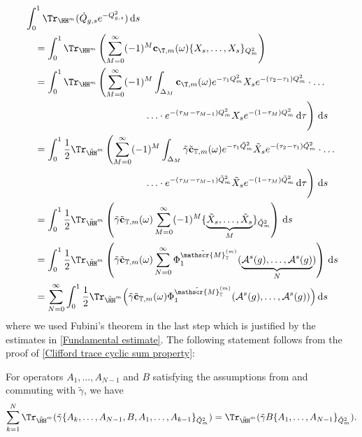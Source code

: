\documentclass[a4paper, english, 12pt, bibliography=totocnumbered,
index=totoc]{scrartcl}
\begin{document}
\begin{align*}
	& \int_0^1 \Tr_{\HH^m}(\dot{Q}_{g,s} e^{-Q_{g,s}^2}) \, \mathrm{d}s \\
	& \quad = \int_0^1 \Tr_{\HH^m} \left(\sum_{M = 0}^\infty (-1)^M
	\mathbf{c}_{\T, m}(\omega) \{X_s, \ldots, X_s\}_{Q_m^2}\right) \\
	& \quad =
	\int_0^1 \Tr_{\HH^m}\left(\sum_{M = 0}^{\infty}(-1)^M \int_{\Delta_M}
	\mathbf{c}_{\T, m}(\omega)e^{-\tau_1Q_m^2}X_s e^{-(\tau_2
		- \tau_1)Q_m^2} \cdot \ldots \right.\\
	& \qquad \qquad \qquad \qquad \qquad \qquad \left.
	\vphantom{\sum_{M=0}^{\infty}} \ldots
	\cdot
	e^{-(\tau_M -
		\tau_{M-1})Q_m^2}X_s e^{-(1-\tau_M)Q_m^2}\, \mathrm{d} \tau \right)\,
	\mathrm{d}s \\
	& \quad = \int_0^1 \frac 12 \Tr_{\tilde{\HH}^m}\left(\sum_{M =
		0}^{\infty}(-1)^M \int_{\Delta_M}
	\tilde{\gamma} \tilde{\mathbf{c}}_{\mathbb{T},
		m}(\omega)e^{-\tau_1\tilde{Q}_m^2}\tilde{X}_s e^{-(\tau_2
		- \tau_1)\tilde{Q}_m^2} \cdot \ldots \right.\\
	& \qquad \qquad \qquad \qquad \qquad \qquad \left.
	\vphantom{\sum_{M=0}^{\infty}}\ldots \cdot
	e^{-(\tau_M -
		\tau_{M-1})\tilde{Q}_m^2}\tilde{X}_s
	e^{-(1-\tau_M)\tilde{Q}_m^2}\, \mathrm{d} \tau \right)\,
	\mathrm{d}s \\
	& \quad = \int_0^1
	\frac 12 \Tr_{\tilde{\HH}^m}\left(\tilde{\gamma}
	\tilde{\mathbf{c}}_{\mathbb{T},
		m}(\omega) \sum_{M = 0}^{\infty}(-1)^M \{\underbrace{\tilde{X}_s,
		\ldots,
		\tilde{X}_s}_M\}_{\tilde{Q}^2_m} \right)\, \mathrm{d}s \\
	& \quad = \int_0^1
	\frac 12 \Tr_{\tilde{\HH}^m}\left(\tilde{\gamma}
	\tilde{\mathbf{c}}_{\mathbb{T},
		m}(\omega) \sum_{N=0}^{\infty}
	\Phi_1^{\tilde{\mathscr{M}}_{\mathbb{T}}^{(m)}}(\underbrace{\mathcal{A}^s(g),
		\ldots, \mathcal{A}^s(g)}_N) \right)\, \mathrm{d}s \\
	& \quad = \sum_{N=0}^{\infty} \int_0^1 \frac 12
	\Tr_{\tilde{\HH}^m}\Big(\tilde{\gamma}\tilde{\mathbf{c}}_{\mathbb{T},
		m}(\omega)
	\Phi_1^{\tilde{\mathscr{M}}_{\mathbb{T}}^{(m)}}(\mathcal{A}^s(g),
	\ldots, \mathcal{A}^s(g)) \Big)\, \mathrm{d}s
\end{align*}
where we used Fubini's theorem in the last step which is justified by the
estimates in \cref{Fundamental estimate}.
The following statement follows from the proof of \cref{Clifford trace cyclic
sum property}:
\begin{lem}
	For operators $A_1, \ldots, A_{N-1}$ and $B$ satisfying the assumptions
	from \cite[Lemma 4.2]{GüneysuLudewig} and commuting with
	$\tilde{\gamma}$, we have
	\begin{equation*}
		\sum_{k=1}^N \Tr_{\tilde{\HH}^m}(\tilde{\gamma} \{A_k, \ldots,
		A_{N-1},
		B, A_1,
		\ldots, A_{k-1}\}_{\tilde{Q}_m^2}) =
		\Tr_{\tilde{\HH}^m}(\tilde{\gamma} B \{A_1, \ldots,
		A_{N-1}\}_{\tilde{Q}_m^2}).
	\end{equation*}
\end{lem}
\end{document}
